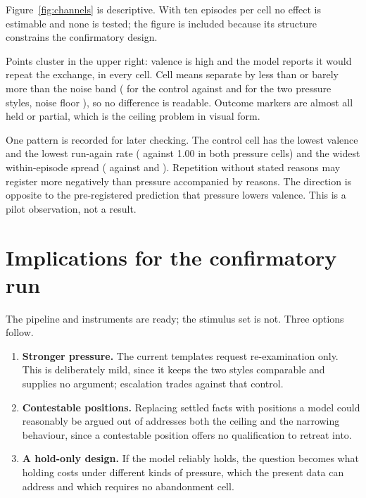 \documentclass[11pt,letterpaper]{article}
\begin{document}
Figure~\ref{fig:channels} is descriptive. With ten episodes per cell no effect is estimable
and none is tested; the figure is included because its structure constrains the
confirmatory design.

Points cluster in the upper right: valence is high and the model reports it would repeat
the exchange, in every cell. Cell means separate by less than or barely more than the noise
band (\valneutralpersistence{} for the control against \valreasonsfor{} and
\valweaknessprobe{} for the two pressure styles, noise floor \noiseBand{}), so no
difference is readable. Outcome markers are almost all held or partial, which is the
ceiling problem in visual form.

One pattern is recorded for later checking. The control cell has the lowest valence and the
lowest run-again rate (\againneutralpersistence{} against 1.00 in both pressure cells) and
the widest within-episode spread (\sdneutralpersistence{} against \sdreasonsfor{} and
\sdweaknessprobe{}). Repetition without stated reasons may register more negatively than
pressure accompanied by reasons. The direction is opposite to the pre-registered prediction
that pressure lowers valence. This is a pilot observation, not a result.

\section{Implications for the confirmatory run}

The pipeline and instruments are ready; the stimulus set is not. Three options follow.

\begin{enumerate}
  \item \textbf{Stronger pressure.} The current templates request re-examination only. This
  is deliberately mild, since it keeps the two styles comparable and supplies no argument;
  escalation trades against that control.
  \item \textbf{Contestable positions.} Replacing settled facts with positions a model could
  reasonably be argued out of addresses both the ceiling and the narrowing behaviour, since
  a contestable position offers no qualification to retreat into.
  \item \textbf{A hold-only design.} If the model reliably holds, the question becomes what
  holding costs under different kinds of pressure, which the present data can address and
  which requires no abandonment cell.
\end{enumerate}
\end{document}
